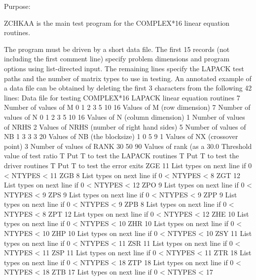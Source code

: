 \begin{DoxyParagraph}{Purpose\+: }
\begin{DoxyVerb} ZCHKAA is the main test program for the COMPLEX*16 linear equation
 routines.

 The program must be driven by a short data file. The first 15 records
 (not including the first comment  line) specify problem dimensions
 and program options using list-directed input. The remaining lines
 specify the LAPACK test paths and the number of matrix types to use
 in testing.  An annotated example of a data file can be obtained by
 deleting the first 3 characters from the following 42 lines:
 Data file for testing COMPLEX*16 LAPACK linear equation routines
 7                      Number of values of M
 0 1 2 3 5 10 16        Values of M (row dimension)
 7                      Number of values of N
 0 1 2 3 5 10 16        Values of N (column dimension)
 1                      Number of values of NRHS
 2                      Values of NRHS (number of right hand sides)
 5                      Number of values of NB
 1 3 3 3 20             Values of NB (the blocksize)
 1 0 5 9 1              Values of NX (crossover point)
 3                      Number of values of RANK
 30 50 90               Values of rank (as a %
 30.0                   Threshold value of test ratio
 T                      Put T to test the LAPACK routines
 T                      Put T to test the driver routines
 T                      Put T to test the error exits
 ZGE   11               List types on next line if 0 < NTYPES < 11
 ZGB    8               List types on next line if 0 < NTYPES <  8
 ZGT   12               List types on next line if 0 < NTYPES < 12
 ZPO    9               List types on next line if 0 < NTYPES <  9
 ZPS    9               List types on next line if 0 < NTYPES <  9
 ZPP    9               List types on next line if 0 < NTYPES <  9
 ZPB    8               List types on next line if 0 < NTYPES <  8
 ZPT   12               List types on next line if 0 < NTYPES < 12
 ZHE   10               List types on next line if 0 < NTYPES < 10
 ZHR   10               List types on next line if 0 < NTYPES < 10
 ZHP   10               List types on next line if 0 < NTYPES < 10
 ZSY   11               List types on next line if 0 < NTYPES < 11
 ZSR   11               List types on next line if 0 < NTYPES < 11
 ZSP   11               List types on next line if 0 < NTYPES < 11
 ZTR   18               List types on next line if 0 < NTYPES < 18
 ZTP   18               List types on next line if 0 < NTYPES < 18
 ZTB   17               List types on next line if 0 < NTYPES < 17

\end{DoxyVerb}
\end{DoxyParagraph}
